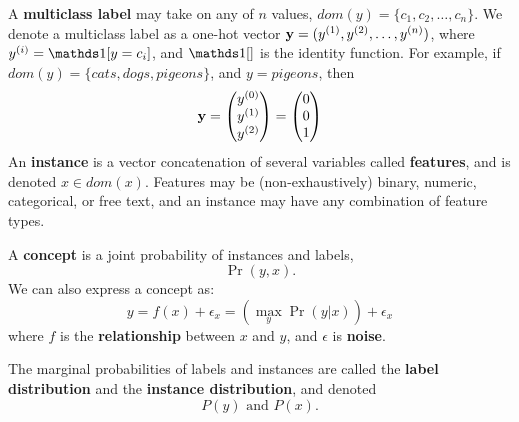 A {\bf multiclass label} may take on any of $n$ values, $dom(y)=\{c_1,c_2,\dots,c_n\}$. We denote a multiclass label as a one-hot vector ${\bf y}=(y^{(1)},y^{(2)},\dots,y^{(n)})$, where $y^{(i)}=\id{y=c_i}$, and $\id{}$ is the identity function. For example, if $dom(y)=\{cats, dogs, pigeons\}$, and $y=pigeons$, then
\begin{equation}
    \bf{y} = \begin{pmatrix}y^{(0)}\\y^{(1)}\\y^{(2)}\end{pmatrix} = \begin{pmatrix}0\\0\\1\end{pmatrix}
\end{equation}
An {\bf instance} is a vector concatenation of several variables called {\bf features}, and is denoted $x\in dom(x)$. Features may be (non-exhaustively) binary, numeric, categorical, or free text, and an instance may have any combination of feature types. 

A {\bf concept} is a joint probability of instances and labels,
\begin{equation}
    \Pr(y,x).
\end{equation}
We can also express a concept as:
\begin{equation}
    y = f(x) + \epsilon_x = \left( \max_y \Pr(y|x) \right) + \epsilon_x
\end{equation}
where $f$ is the {\bf relationship} between $x$ and $y$, and $\epsilon$ is {\bf noise}. 

The marginal probabilities of labels and instances are called the {\bf label distribution} and the {\bf instance distribution}, and denoted
\begin{equation}
    P(y) \text{ and } P(x).
\end{equation}
 
